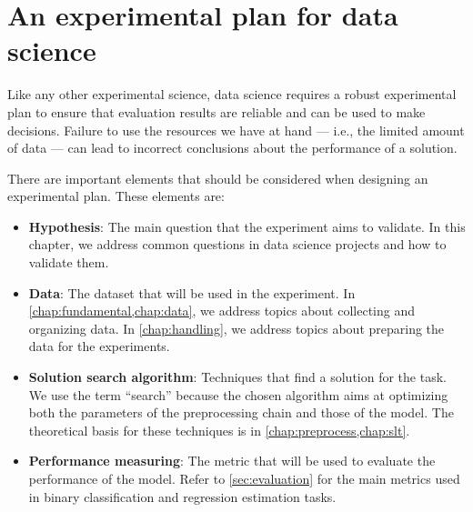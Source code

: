 

\section{An experimental plan for data science}

Like any other experimental science, data science requires a robust experimental
plan to ensure that evaluation results are reliable and can be used to make decisions.
Failure to use the resources we have at hand --- i.e., the limited amount of data ---
can lead to incorrect conclusions about the performance of a solution.

There are important elements that should be considered when designing an experimental
plan.  These elements are:
\begin{itemize}
  \item \textbf{Hypothesis}: The main question that the experiment aims to validate.
    In this chapter, we address common questions in data science projects and how to
    validate them.
  \item \textbf{Data}: The dataset that will be used in the experiment.  In
    \cref{chap:fundamental,chap:data}, we address topics about collecting and organizing data.
    In \cref{chap:handling}, we address topics about preparing the data for the
    experiments.
  \item \textbf{Solution search algorithm}: Techniques that find a solution for the task.
    We use the term ``search'' because the chosen algorithm aims at optimizing both the
    parameters of the preprocessing chain and those of the \gls{model}. The theoretical
    basis for these techniques is in \cref{chap:preprocess,chap:slt}.
  \item \textbf{Performance measuring}: The metric that will be used to evaluate the
    performance of the \gls{model}.  Refer to \cref{sec:evaluation} for the main metrics used in
    binary classification and regression estimation tasks.
\end{itemize}

